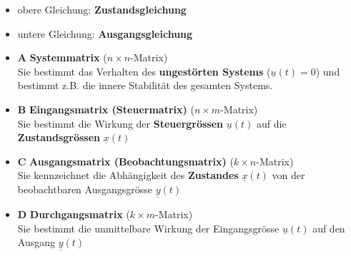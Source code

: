 \begin{itemize}
    \item obere Gleichung: \textbf{Zustandsgleichung}
    \item untere Gleichung: \textbf{Ausgangsgleichung}
    \item $\bm{A}$ \textbf{Systemmatrix} ($n \times n$-Matrix) \\
        Sie bestimmt das Verhalten des \textbf{ungestörten Systems} ($\underline{u}(t) = 0$)
        und bestimmt z.B. die innere Stabilität des gesamten Systems.
    \item $\bm{B}$ \textbf{Eingangsmatrix (Steuermatrix)} ($n \times m$-Matrix) \\
        Sie bestimmt die Wirkung der \textbf{Steuergrössen} $\underline{u}(t)$ auf die \textbf{Zustandsgrössen} $\underline{x}(t)$
    \item $\bm{C}$ \textbf{Ausgangsmatrix (Beobachtungsmatrix)} ($k \times n$-Matrix) \\
        Sie kennzeichnet die Abhängigkeit des \textbf{Zustandes} $\underline{x}(t)$ von der beobachtbaren Ausgangsgrösse $\underline{y}(t)$
    \item $\bm{D}$ \textbf{Durchgangsmatrix} ($k \times m$-Matrix) \\
        Sie bestimmt die unmittelbare Wirkung der Eingangsgrösse $\underline{u}(t)$ auf den Ausgang $\underline{y}(t)$
\end{itemize}


